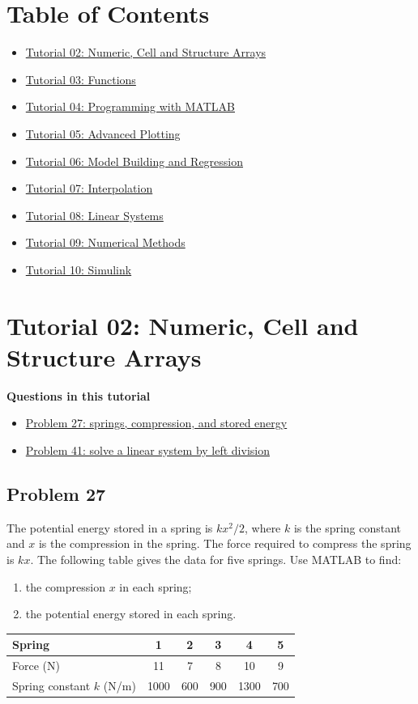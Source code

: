 \documentclass[12pt]{article}
\newcommand{\tutorialsection}[2]{%
    \clearpage
    \phantomsection
    \hypertarget{#1}{}%
    \section*{#2}
}
\newcommand{\questiontitle}[2]{%
    \phantomsection
    \hypertarget{#1}{}%
    \subsection*{#2}
}
\newcommand{\minitoc}[1]{%
    \noindent\textbf{Questions in this tutorial}
    \begin{itemize}[leftmargin=1.5em, itemsep=0.2em]
        #1
    \end{itemize}
}
\begin{document}
\section*{Table of Contents}
\begin{itemize}[leftmargin=1.5em, itemsep=0.35em]
    \item \hyperlink{tut2}{Tutorial 02: Numeric, Cell and Structure Arrays}
    \item \hyperlink{tut3}{Tutorial 03: Functions}
    \item \hyperlink{tut4}{Tutorial 04: Programming with MATLAB}
    \item \hyperlink{tut5}{Tutorial 05: Advanced Plotting}
    \item \hyperlink{tut6}{\textcolor{tutorialsix}{Tutorial 06: Model Building and Regression}}
    \item \hyperlink{tut7}{Tutorial 07: Interpolation}
    \item \hyperlink{tut8}{Tutorial 08: Linear Systems}
    \item \hyperlink{tut9}{Tutorial 09: Numerical Methods}
    \item \hyperlink{tut10}{Tutorial 10: Simulink}
\end{itemize}

\tutorialsection{tut2}{Tutorial 02: Numeric, Cell and Structure Arrays}
\minitoc{
    \item \hyperlink{tut2-q27}{Problem 27: springs, compression, and stored energy}
    \item \hyperlink{tut2-q41}{Problem 41: solve a linear system by left division}
}

\questiontitle{tut2-q27}{Problem 27}
The potential energy stored in a spring is $kx^{2}/2$, where $k$ is the spring constant and $x$ is the compression in the spring. The force required to compress the spring is $kx$. The following table gives the data for five springs. Use MATLAB to find:
\begin{enumerate}[label=\alph*.]
    \item the compression $x$ in each spring;
    \item the potential energy stored in each spring.
\end{enumerate}

\begin{center}
\begin{tabular}{>{\raggedright\arraybackslash}p{2.2in}ccccc}
\toprule
Spring & 1 & 2 & 3 & 4 & 5 \\
\midrule
Force (N) & 11 & 7 & 8 & 10 & 9 \\
Spring constant $k$ (N/m) & 1000 & 600 & 900 & 1300 & 700 \\
\bottomrule
\end{tabular}
\end{center}
\end{document}
